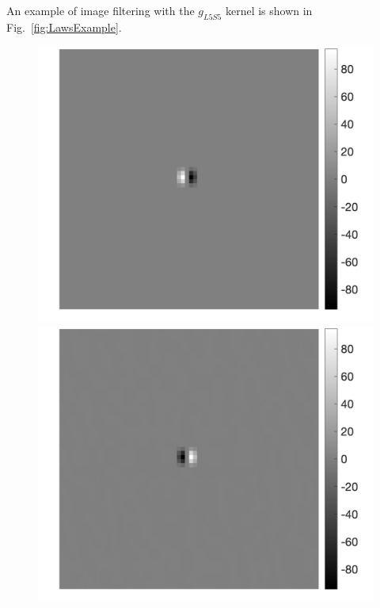 \documentclass[fleqn,a4paper,oneside,openany]{book}
\begin{document}
An example of image filtering with the $g_{L5S5}$ kernel is shown in Fig.~\ref{fig:LawsExample}.

\begin{figure}[!t] 
\centering
   \begin{minipage}[b]{0.45\textwidth} 
     \centering
     \includegraphics[trim = 0 0 0 0, clip,scale=0.40]{example_3a1_outlier.png}
   \end{minipage}
   \begin{minipage}[b]{0.45\textwidth}
     \centering
     \includegraphics[trim = 0 0 0 0, clip, scale=0.40]{example_3a1_crm.png}

\end{minipage}
\end{figure}
\end{document}
